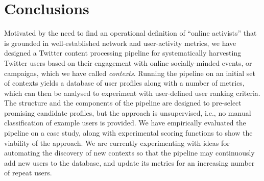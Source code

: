 \section{Conclusions}
\vspace{-10pt}

Motivated by the need to find an operational definition of ``online activists'' that is grounded in well-established network and user-activity metrics, we have designed a Twitter content processing pipeline for systematically harvesting Twitter users based on their engagement with online socially-minded events, or campaigns, which we have called \textit{contexts}.
Running the pipeline on an initial set of contexts yields a database of user profiles along with a number of metrics, which can then be analysed to experiment with user-defined user ranking criteria. The structure and the components of the pipeline are designed to pre-select promising candidate profiles, but the approach is unsupervised, i.e., no manual classification of example users is provided.
We have empirically evaluated the pipeline on a case study, along with experimental scoring functions to show the viability of the approach. 
We are currently experimenting with ideas for automating the discovery of new contexts so that the pipeline may continuously add new users to the database, and update its metrics for an increasing number of  repeat users.